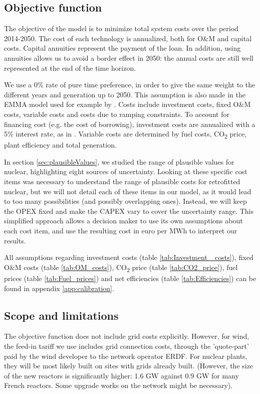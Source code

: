 \subsection{Objective function}

The objective of the model is to minimize total system costs over the period 2014-2050.
The cost of each technology is annualized, both for O\&M and capital costs. 
Capital annuities represent the payment of the loan. 
In addition, using annuities allows us to avoid a border effect in 2050: the annual costs are still well represented at the end of the time horizon.

We use a 0\% rate of pure time preference, in order to give the same weight to the different years and generation up to 2050. This assumption is also made in the EMMA model \citep{EMMA} used for example by \citet{Hirth2016}.
Costs include investment costs, fixed O\&M costs, variable costs and costs due to ramping constraints.
To account for financing cost (e.g. the cost of borrowing), investment costs are annualized with a 5\% interest rate, as in \citet{Jagemann2013}.
Variable costs are determined by fuel costs, CO\textsubscript{2} price, plant efficiency and total generation.

In section \ref{sec:plausibleValues}, we studied the range of plausible values for nuclear, highlighting eight sources of uncertainty. Looking at these specific cost items was necessary to understand the range of plausible costs for retrofitted nuclear, but we will not detail each of these items in our model, as it would lead to too many possibilities (and possibly overlapping ones). Instead, we will keep the OPEX fixed and make the CAPEX vary to cover the uncertainty range. This simplified approach allows a decision maker to use its own assumptions about each cost item, and use the resulting cost in euro per MWh to interpret our results.

All assumptions regarding investment costs (table \ref{tab:Investment _costs}), fixed O\&M costs (table \ref{tab:OM_costs}), CO\textsubscript{2} price (table \ref{tab:CO2_price}), fuel prices (table \ref{tab:Fuel_prices}) and net efficiencies (table \ref{tab:Efficiencies}) can be found in appendix \ref{app:calibration}.

\subsection{Scope and limitations}

The objective function does not include grid costs explicitly.
However, for wind, the feed-in tariff we use includes grid connection costs, through the 'quote-part' paid by the wind developer to the network operator ERDF.
For nuclear plants, they will be most likely built on sites with grids already built. (However, the size of the new reactors is significantly higher: 1.6 GW against 0.9 GW for many French reactors. Some upgrade works on the network might be necessary).

